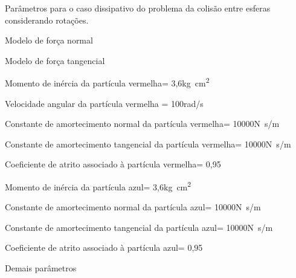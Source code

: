 \begin{table}[h]
\centering
\caption{Parâmetros para o caso dissipativo do problema da colisão entre esferas considerando rotações.}
\label{tab:colliding_spheres:dissipative:rotation:parameters}
\begin{parametersdesc}{\textwidth}
	\item{Modelo de força normal}{}{\emptyUnit}
	\item{Modelo de força tangencial}{}{\emptyUnit}
	\hline
	\item{Momento de inércia da partícula vermelha}{\redMomentOfInertia = 3,6}{\si[per-mode=symbol]{\kilogram\square\centi\meter}}
	\item{Velocidade angular da partícula vermelha}{\initial{\redAngularVelocityScalar} = 100}{\si[per-mode=symbol]{\radian\per\second}}
	\item{Constante de amortecimento normal da partícula vermelha}{\redNormalDampingConstant = \SI{10000}{}}{\si[per-mode=symbol]{\newton\second\per\meter}}
	\item{Constante de amortecimento tangencial da partícula vermelha}{\redTangentialDampingConstant = \SI{10000}{}}{\si[per-mode=symbol]{\newton\second\per\meter}}
	\item{Coeficiente de atrito associado à partícula vermelha}{\redDynamicFriction = 0,95}{\emptyUnit}
	\hline
	\item{Momento de inércia da partícula azul}{\blueMomentOfInertia = 3,6}{\si[per-mode=symbol]{\kilogram\square\centi\meter}}
	\item{Constante de amortecimento normal da partícula azul}{\blueNormalDampingConstant = \SI{10000}{}}{\si[per-mode=symbol]{\newton\second\per\meter}}
	\item{Constante de amortecimento tangencial da partícula azul}{\blueTangentialDampingConstant = \SI{10000}{}}{\si[per-mode=symbol]{\newton\second\per\meter}}
	\item{Coeficiente de atrito associado à partícula azul}{\blueDynamicFriction = 0,95}{\emptyUnit}
	\hline
	\item{Demais parâmetros}{}{}
\end{parametersdesc}
\sourceMe 
\end{table}

